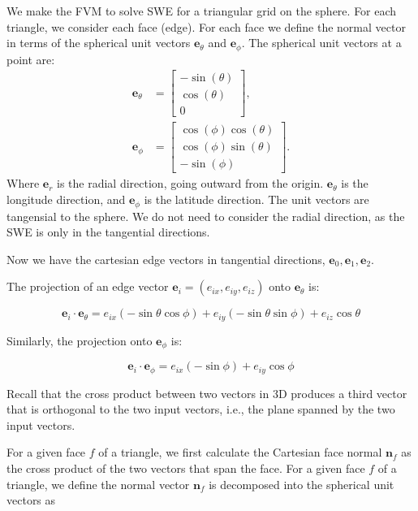 We make the FVM to solve SWE for a triangular grid on the sphere.
For each triangle, we consider each face (edge).
For each face we define the normal vector in terms of the spherical unit vectors $\mathbf{e}_\theta$ and $\mathbf{e}_\phi$.
The spherical unit vectors at a point are:
\begin{align*}
    \mathbf{e}_\theta &= \begin{bmatrix}
        - \sin(\theta) \\
        \cos(\theta) \\
        0
    \end{bmatrix}, \\
    \mathbf{e}_\phi &= \begin{bmatrix}
        \cos(\phi) \cos(\theta) \\
        \cos(\phi) \sin(\theta) \\
        -\sin(\phi)
    \end{bmatrix}.
\end{align*}
Where $\mathbf{e}_r$ is the radial direction, going outward from the origin.
$\mathbf{e}_\theta$ is the longitude direction, and $\mathbf{e}_\phi$ is the latitude direction.
The unit vectors are tangensial to the sphere.
We do not need to consider the radial direction, as the SWE is only in the tangential directions.

Now we have the cartesian edge vectors in tangential directions, $\mathbf{e}_0, \mathbf{e}_1, \mathbf{e}_2$.

The projection of an edge vector \( \mathbf{e}_i = (e_{ix}, e_{iy}, e_{iz}) \) onto \( \mathbf{e}_\theta \) is:

\[
\mathbf{e}_i \cdot \mathbf{e}_\theta = e_{ix} \left( -\sin \theta \cos \phi \right) + e_{iy} \left( -\sin \theta \sin \phi \right) + e_{iz} \cos \theta
\]

Similarly, the projection onto \( \mathbf{e}_\phi \) is:

\[
\mathbf{e}_i \cdot \mathbf{e}_\phi = e_{ix} \left( -\sin \phi \right) + e_{iy} \cos \phi
\]

Recall that the cross product between two vectors in 3D produces a third vector that is orthogonal to the two input vectors, i.e., the plane spanned by the two input vectors.

For a given face $f$ of a triangle, we first calculate the Cartesian face normal $\mathbf{n}_f$ as the cross product of the two vectors that span the face.
For a given face $f$ of a triangle, we define the normal vector $\mathbf{n}_f$ is decomposed into the spherical unit vectors as


